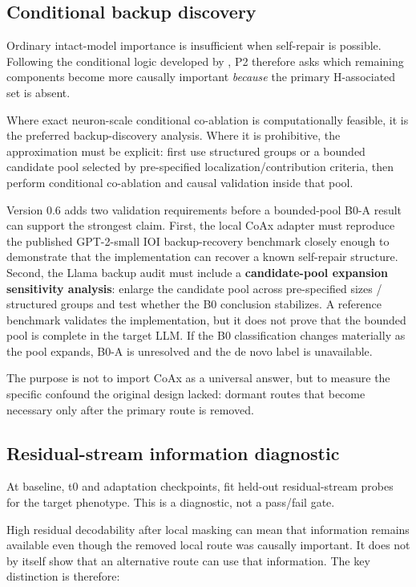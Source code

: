 \subsection{Conditional backup discovery}\label{conditional-backup-discovery}

Ordinary intact-model importance is insufficient when self-repair is possible. Following the conditional logic developed by \textcite{gong2026coax}, P2 therefore asks which remaining components become more causally important \emph{because} the primary H-associated set is absent.

Where exact neuron-scale conditional co-ablation is computationally feasible, it is the preferred backup-discovery analysis. Where it is prohibitive, the approximation must be explicit: first use structured groups or a bounded candidate pool selected by pre-specified localization/contribution criteria, then perform conditional co-ablation and causal validation inside that pool.

Version 0.6 adds two validation requirements before a bounded-pool B0-A result can support the strongest claim. First, the local CoAx adapter must reproduce the published GPT-2-small IOI backup-recovery benchmark closely enough to demonstrate that the implementation can recover a known self-repair structure. Second, the Llama backup audit must include a \textbf{candidate-pool expansion sensitivity analysis}: enlarge the candidate pool across pre-specified sizes / structured groups and test whether the B0 conclusion stabilizes. A reference benchmark validates the implementation, but it does not prove that the bounded pool is complete in the target LLM. If the B0 classification changes materially as the pool expands, B0-A is unresolved and the de novo label is unavailable.

The purpose is not to import CoAx as a universal answer, but to measure the specific confound the original design lacked: dormant routes that become necessary only after the primary route is removed.

\subsection{Residual-stream information diagnostic}\label{residual-stream-information-diagnostic}

At baseline, t0 and adaptation checkpoints, fit held-out residual-stream probes for the target phenotype. This is a diagnostic, not a pass/fail gate.

High residual decodability after local masking can mean that information remains available even though the removed local route was causally important. It does not by itself show that an alternative route can use that information. The key distinction is therefore:

